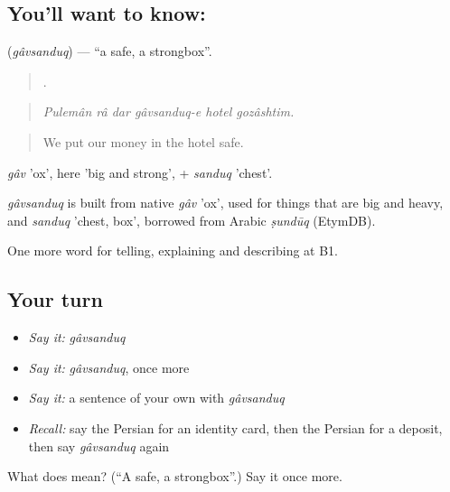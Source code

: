 \subsection*{You'll want to know: }
\textbf{} (\emph{gâvsanduq}) — \textquotedblleft{}a safe, a strongbox\textquotedblright{}.

\begin{quote}
     .
\end{quote}

\begin{quote}
\emph{Pulemân râ dar gâvsanduq-e hotel gozâshtim.}
\end{quote}

\begin{quote}
We put our money in the hotel safe.
\end{quote}

\emph{gâv} 'ox', here 'big and strong', + \emph{sanduq} 'chest'.

\begin{cousinweb}
\emph{gâvsanduq} is built from native \emph{gâv} 'ox', used for things that are big and heavy, and \emph{sanduq} 'chest, box', borrowed from Arabic \emph{ṣundūq} (EtymDB).
\end{cousinweb}

\begin{grammarlens}[title={What you've built}]
One more word for telling, explaining and describing at B1.
\end{grammarlens}

\subsection*{Your turn}
\begin{itemize}
\raggedright
  \item \emph{Say it:} \emph{gâvsanduq}
  \item \emph{Say it:} \emph{gâvsanduq}, once more
  \item \emph{Say it:} a sentence of your own with \emph{gâvsanduq}
  \item \emph{Recall:} say the Persian for an identity card, then the Persian for a deposit, then say \emph{gâvsanduq} again
\end{itemize}

\begin{tcolorbox}[breakable,colback=teal!4,colframe=teal!35!black,title={Before you move on}]
What does  mean? (\textquotedblleft{}A safe, a strongbox\textquotedblright{}.) Say it once more.
\end{tcolorbox}
